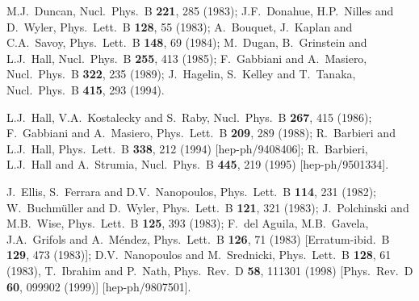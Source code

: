 \documentclass[11pt]{article}
\begin{document}
\begin{thebibliography}{999}
M.J.~Duncan, 
  Nucl.\ Phys.\ B {\bf 221}, 285 (1983);
J.F.~Donahue, H.P.~Nilles and D.~Wyler, 
  Phys.\ Lett.\ B {\bf 128}, 55 (1983);
A.~Bouquet, J.~Kaplan and C.A.~Savoy, 
  Phys.\ Lett.\ B {\bf 148}, 69 (1984);
M.~Dugan, B.~Grinstein and L.J.~Hall, 
  Nucl.\ Phys.\ B {\bf 255}, 413 (1985);
F.~Gabbiani and A.~Masiero, 
  Nucl.\ Phys.\ B {\bf 322}, 235 (1989);
J.~Hagelin, S.~Kelley and T.~Tanaka, 
  Nucl.\ Phys.\ B {\bf 415}, 293 (1994).

L.J.~Hall, V.A.~Kostalecky and S.~Raby,
  Nucl.\ Phys.\ B {\bf 267}, 415 (1986);
F.~Gabbiani and A.~Masiero,
  Phys.\ Lett.\ B {\bf 209}, 289 (1988);
R.~Barbieri and L.J.~Hall,
  Phys.\ Lett.\ B {\bf 338}, 212 (1994)
  [hep-ph/9408406];
R.~Barbieri, L.J.~Hall and A.~Strumia,
  Nucl.\ Phys.\ B {\bf 445}, 219 (1995)
  [hep-ph/9501334].

J.~Ellis, S.~Ferrara and D.V.~Nanopoulos, 
  Phys.\ Lett.\ B {\bf 114}, 231 (1982);
W.~Buchm\"uller and D.~Wyler,
  Phys.\ Lett.\ B {\bf 121}, 321 (1983);
J.~Polchinski and M.B.~Wise, 
  Phys.\ Lett.\ B {\bf 125}, 393 (1983);
F.~del Aguila, M.B.~Gavela, J.A.~Grifols and A.~M\'endez,
  Phys.\ Lett.\ B {\bf 126}, 71 (1983)
  [Erratum-ibid.\ B {\bf 129}, 473 (1983)];
D.V.~Nanopoulos and M.~Srednicki,
  Phys.\ Lett.\ B {\bf 128}, 61 (1983),
T.~Ibrahim and P.~Nath,
  Phys.\ Rev.\ D {\bf 58}, 111301 (1998)
  [Phys.\ Rev.\ D {\bf 60}, 099902 (1999)]
  [hep-ph/9807501].
  

\end{thebibliography}
\end{document}
